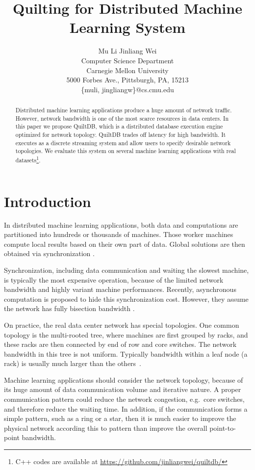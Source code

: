 \documentclass[11pt, twocolumn]{article}
\title{Quilting for Distributed Machine Learning System}
\author{Mu Li \quad Jinliang Wei\\ Computer Science Department
  \\Carnegie Mellon University\\
  5000 Forbes Ave., Pittsburgh, PA, 15213\\
\{muli, jingliangw\}@cs.cmu.edu}
\begin{document}
\maketitle

\begin{abstract}
  Distributed machine learning applications produce a huge amount of network
  traffic. However, network bandwidth is one of the most scarce resources in
  data centers.  In this paper we propose QuiltDB, which is a distributed
  database execution engine optimized for network topology. QuiltDB trades off
  latency for high bandwidth. It executes as a discrete streaming system and
  allow users to specify desirable network topologies. We evaluate this system
  on several machine learning applications with real datasets\footnote{C++ codes
    are available at \url{https://github.com/jinliangwei/quiltdb/}}.
\end{abstract}

\section{Introduction}

In distributed machine learning applications, both data and computations are
partitioned into hundreds or  thousands of machines. Those
worker machines compute local results based on their own part of data. Global solutions
are then obtained via synchronization \cite{AhmSheNarJosSmo13,
  HoCipCuiLeeetal13,Lietal13,DeaCorMonCheetal12,GonLowGuBicetal12,CheSonBaiLinetal11}.

Synchronization, including data communication and waiting the slowest machine, is typically
the most expensive operation, because of the limited network bandwidth and highly
variant machine performances. Recently, asynchronous computation is proposed
to hide this synchronization cost. However, they assume the network has fully
bisection bandwidth \cite{AsuSmyWel08,SmoNar10,AhmSheNarJosSmo13,Lietal13}.

On practice, the real data center network has special topologies. One common
topology is the multi-rooted tree, where  machines are first grouped by racks,
and these racks are then connected by
end of row and core switches. The network bandwidth in this tree is not
uniform. Typically bandwidth within a leaf node (a rack) is usually much larger
than the others~\cite{AlFLouVah08, BarHol09}.

Machine learning applications should consider the network topology, because of
its huge amount of data communication volume and iterative nature. A proper
communication pattern could reduce the network congestion, e.g.~core switches,
and therefore reduce the waiting time. In addition,
if the communication forms a simple pattern, such as a ring or a star, then it
is much easier to improve the physical network according this to pattern than
improve the overall point-to-point bandwidth.
\end{document}
